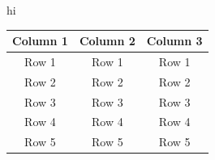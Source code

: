 \documentclass{article}
\begin{document}
hi

\begin{tabular}{|c|c|c|}
\hline
Column 1 & Column 2 & Column 3 \\
\hline
Row 1 & Row 1 & Row 1 \\
\hline
Row 2 & Row 2 & Row 2 \\
\hline
Row 3 & Row 3 & Row 3 \\
\hline
Row 4 & Row 4 & Row 4 \\
\hline
Row 5 & Row 5 & Row 5 \\
\hline
\end{tabular}
\end{document}
